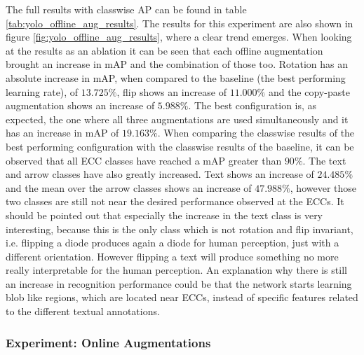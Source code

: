 The full results with classwise \ac{AP} can be found in table \ref{tab:yolo_offline_aug_results}.
The results for this experiment are also shown in figure \ref{fig:yolo_offline_aug_results}, where a clear trend emerges.
When looking at the results as an ablation it can be seen that each offline augmentation brought an increase in \ac{mAP} and the combination of those too.
Rotation has an absolute increase in mAP, when compared to the baseline (the best performing learning rate), of $13.725\%$, flip shows an increase of $11.000\%$ and the copy-paste augmentation shows an increase of $5.988\%$.
The best configuration is, as expected, the one where all three augmentations are used simultaneously and it has an increase in \ac{mAP} of $19.163\%$.
When comparing the classwise results of the best performing configuration with the classwise results of the baseline, it can be observed that all \ac{ECC} classes have reached a \ac{mAP} greater than $90\%$.
The text and arrow classes have also greatly increased.
Text shows an increase of $24.485\%$ and the mean over the arrow classes shows an increase of $47.988\%$, however those two classes are still not near the desired performance observed at the \acp{ECC}.
It should be pointed out that especially the increase in the text class is very interesting, because this is the only class which is not rotation and flip invariant, i.e. flipping a diode produces again a diode for human perception, just with a different orientation.
However flipping a text will produce something no more really interpretable for the human perception.
An explanation why there is still an increase in recognition performance could be that the network starts learning blob like regions, which are located near \acp{ECC}, instead of specific features related to the different textual annotations.


\subsubsection{Experiment: Online Augmentations}

